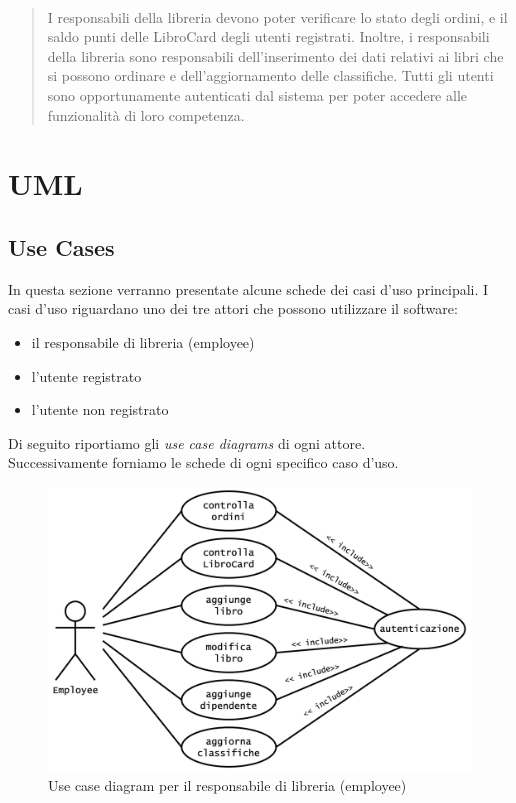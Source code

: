 \documentclass[12pt,a4paper]{article}
\begin{document}
\begin{quotation}
{		\paragraph{}I responsabili della libreria devono poter verificare lo stato degli ordini, e il saldo punti delle LibroCard degli utenti registrati.
		Inoltre, i responsabili della libreria sono responsabili dell’inserimento dei dati relativi ai libri che si possono ordinare e dell’aggiornamento delle classifiche.
		Tutti gli utenti sono opportunamente autenticati dal sistema per poter accedere alle funzionalità di loro competenza.}
	\end{quotation}
	\section{UML}
	\subsection{Use Cases}
	In questa sezione verranno presentate alcune schede dei casi d'uso principali. I casi d'uso riguardano uno dei tre attori che possono utilizzare il software:
	\begin{itemize}
		\item il responsabile di libreria (employee)
		\item l'utente registrato 
		\item l'utente non registrato
	\end{itemize}
	Di seguito riportiamo gli \textit{use case diagrams} di ogni attore.\\Successivamente forniamo le schede di ogni specifico caso d'uso.
	\begin{figure}[h!]
		\centering
		\includegraphics[scale=0.4]{images/UseCaseDiagrams/EmployeeDiagram.png}
		\caption{Use case diagram per il responsabile di libreria (employee)}
	\end{figure}
\end{document}
